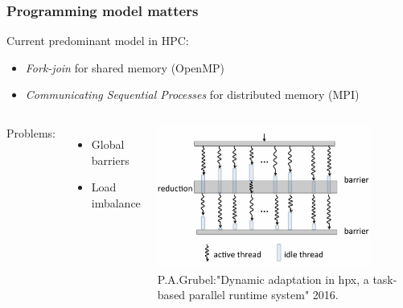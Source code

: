 \documentclass[compress]{beamer}
\begin{document}
\begin{frame}
	\frametitle{Programming model matters}
	Current predominant model in HPC:
	\begin{itemize}
		\item \emph{Fork-join} for shared memory (OpenMP)
		\item \emph{Communicating Sequential Processes} for distributed memory (MPI)
	\end{itemize}
	\vspace{-10mm}
	\pause
	\begin{columns}
		\column{\dimexpr\linewidth-75mm}
		Problems:
		\begin{itemize}
			\item Global barriers
			\item Load imbalance
		\end{itemize}
		\column{80mm}
		\begin{center}
			\includegraphics[width=70mm]{Figures/globalBarriersAndThreadIdleTime.png}\\
			\vspace{-1mm}
			\tiny P.A.Grubel:"Dynamic adaptation in hpx, a task-based parallel runtime system" 2016.
			\normalsize
		\end{center}
	\end{columns}
\end{frame}

\end{document}
